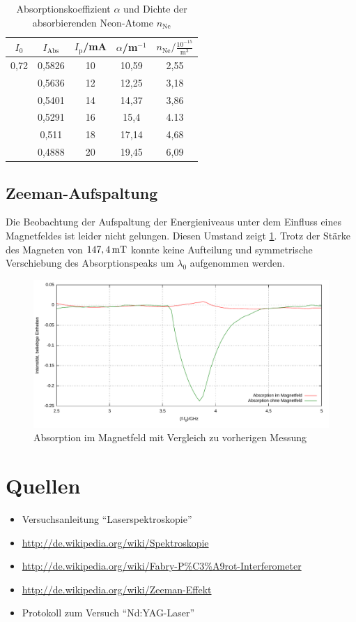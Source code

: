 \documentclass[numbers=noenddot,12pt,a4paper]{scrartcl}
\newcommand{\ix}[1]{_\text{#1}}
\begin{document}
\begin{table}[H]
	\centering
	\begin{tabular}{c|c|c|c|c}
		$I\ix{0}$ & $I\ix{Abs}$ & $I\ix{p}$/mA & $\alpha$/m$^{-1}$ & $n\ix{Ne}/\frac{10^{-15}}{\text{m}^3}$ \\ \hline
		0,72 & 0,5826 & 10 & 10,59 & 2,55 \\
			 & 0,5636 & 12 & 12,25 & 3,18\\
			 & 0,5401 & 14 & 14,37 & 3,86\\
			 & 0,5291 & 16 & 15,4  & 4.13\\
			 & 0,511  & 18 & 17,14 & 4,68\\
			 & 0,4888 & 20 & 19,45 & 6,09\\
	\end{tabular}
\caption{Absorptionskoeffizient $\alpha$ und Dichte der absorbierenden Neon-Atome $n\ix{Ne}$}\label{tab:dicht}
\end{table}
\subsection{Zeeman-Aufspaltung}
Die Beobachtung der Aufspaltung der Energieniveaus unter dem Einfluss eines Magnetfeldes ist leider nicht gelungen. Diesen Umstand zeigt \ref{img:zeeman}. Trotz der Stärke des Magneten von $\unit[147,4]{mT}$ konnte keine Aufteilung und symmetrische Verschiebung des Absorptionspeaks um $\lambda\ix{0}$ aufgenommen werden.
\begin{figure}[H]
	\centering
	\includegraphics[width=\textwidth]{messwerte/zeeman.pdf}
	\caption{Absorption im Magnetfeld mit Vergleich zu vorherigen Messung}\label{img:zeeman}
\end{figure}
\newpage
\section{Quellen}
\begin{itemize}
\item{Versuchsanleitung "`Laserspektroskopie"'}
\item{\url{http://de.wikipedia.org/wiki/Spektroskopie}}
\item{\url{http://de.wikipedia.org/wiki/Fabry-P%C3%A9rot-Interferometer}}
\item{\url{http://de.wikipedia.org/wiki/Zeeman-Effekt}}
\item{Protokoll zum Versuch "`Nd:YAG-Laser"'}
\end{itemize}
\end{document}
